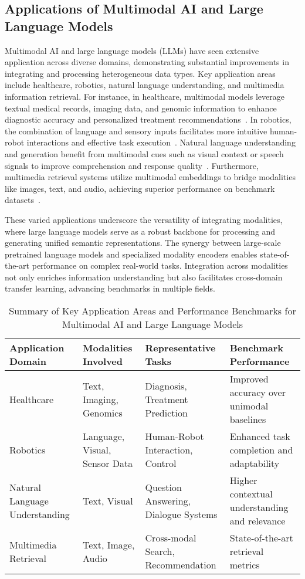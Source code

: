 \documentclass[sigconf]{acmart}
\begin{document}
\subsection{Applications of Multimodal AI and Large Language Models}

Multimodal AI and large language models (LLMs) have seen extensive application across diverse domains, demonstrating substantial improvements in integrating and processing heterogeneous data types. Key application areas include healthcare, robotics, natural language understanding, and multimedia information retrieval. For instance, in healthcare, multimodal models leverage textual medical records, imaging data, and genomic information to enhance diagnostic accuracy and personalized treatment recommendations~\cite{}. In robotics, the combination of language and sensory inputs facilitates more intuitive human-robot interactions and effective task execution~\cite{}. Natural language understanding and generation benefit from multimodal cues such as visual context or speech signals to improve comprehension and response quality~\cite{}. Furthermore, multimedia retrieval systems utilize multimodal embeddings to bridge modalities like images, text, and audio, achieving superior performance on benchmark datasets~\cite{}.

These varied applications underscore the versatility of integrating modalities, where large language models serve as a robust backbone for processing and generating unified semantic representations. The synergy between large-scale pretrained language models and specialized modality encoders enables state-of-the-art performance on complex real-world tasks. Integration across modalities not only enriches information understanding but also facilitates cross-domain transfer learning, advancing benchmarks in multiple fields.

\begin{table*}[htbp]
\centering
\caption{Summary of Key Application Areas and Performance Benchmarks for Multimodal AI and Large Language Models}
\label{tab:applications_benchmarks}
\begin{adjustbox}{max width=\textwidth}
\begin{tabular}{@{}llll@{}}
\toprule
Application Domain & Modalities Involved & Representative Tasks & Benchmark Performance \\
\midrule
Healthcare & Text, Imaging, Genomics & Diagnosis, Treatment Prediction & Improved accuracy over unimodal baselines \\
Robotics & Language, Visual, Sensor Data & Human-Robot Interaction, Control & Enhanced task completion and adaptability \\
Natural Language Understanding & Text, Visual & Question Answering, Dialogue Systems & Higher contextual understanding and relevance \\
Multimedia Retrieval & Text, Image, Audio & Cross-modal Search, Recommendation & State-of-the-art retrieval metrics \\
\bottomrule
\end{tabular}
\end{adjustbox}
\end{table*}
\end{document}
